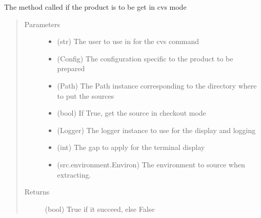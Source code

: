\documentclass[a4paper,10pt,english]{sphinxmanual}
\begin{document}
\begin{fulllineitems}
\label{\detokenize{apidoc_commands/commands:commands.source.get_source_from_cvs}}
The method called if the product is to be get in cvs mode
\begin{quote}\begin{description}
\item[{Parameters}] \leavevmode\begin{itemize}
\item {} 
 \textendash{} (str) The user to use in for the cvs command

\item {} 
 \textendash{} (Config) 
The configuration specific to the product to be prepared

\item {} 
 \textendash{} (Path) 
The Path instance corresponding to the directory 
where to put the sources

\item {} 
 \textendash{} (bool) If True, get the source in checkout mode

\item {} 
 \textendash{} (Logger) 
The logger instance to use for the display and logging

\item {} 
 \textendash{} (int) The gap to apply for the terminal display

\item {} 
 \textendash{} (src.environment.Environ) 
The environment to source when extracting.

\end{itemize}

\item[{Returns}] \leavevmode
(bool) True if it succeed, else False

\end{description}\end{quote}

\end{fulllineitems}
\end{document}
